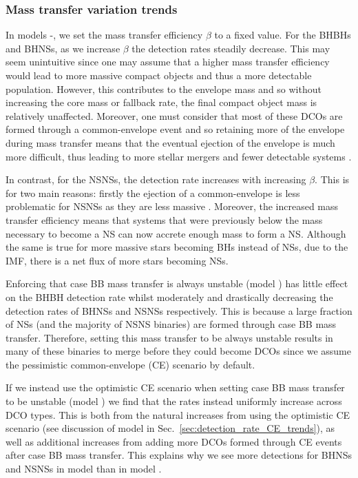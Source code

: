 \subsubsection{Mass transfer variation trends}

In models \modBetaLow{}-\modBetaHigh{}, we set the mass transfer efficiency $\beta$ to a fixed value. For the BHBHs and BHNSs, as we increase $\beta$ the detection rates steadily decrease. This may seem unintuitive since one may assume that a higher mass transfer efficiency would lead to more massive compact objects and thus a more detectable population. However, this contributes to the envelope mass and so without increasing the core mass or fallback rate, the final compact object mass is relatively unaffected. Moreover, one must consider that most of these DCOs are formed through a common-envelope event and so retaining more of the envelope during mass transfer means that the eventual ejection of the envelope is much more difficult, thus leading to more stellar mergers and fewer detectable systems \citep[e.g.][]{Kruckow+2018,Broekgaarden+2021}.

In contrast, for the NSNSs, the detection rate increases with increasing $\beta$. This is for two main reasons: firstly the ejection of a common-envelope is less problematic for NSNSs as they are less massive \citep[e.g.][]{Kruckow+2018}. Moreover, the increased mass transfer efficiency means that systems that were previously below the mass necessary to become a NS can now accrete enough mass to form a NS. Although the same is true for more massive stars becoming BHs instead of NSs, due to the IMF, there is a net flux of more stars becoming NSs.

Enforcing that case BB mass transfer is always unstable (model \modCaseBB{}) has little effect on the BHBH detection rate whilst moderately and drastically decreasing the detection rates of BHNSs and NSNSs respectively. This is because a large fraction of NSs (and the majority of NSNS binaries) are formed through case BB mass transfer. Therefore, setting this mass transfer to be always unstable results in many of these binaries to merge before they could become DCOs since we assume the pessimistic common-envelope (CE) scenario by default.

If we instead use the optimistic CE scenario when setting case BB mass transfer to be unstable (model \modCaseBBOpt{}) we find that the rates instead uniformly increase across DCO types. This is both from the natural increases from using the optimistic CE scenario (see discussion of model \modOpt{} in Sec.~\ref{sec:detection_rate_CE_trends}), as well as additional increases from adding more DCOs formed through CE events after case BB mass transfer. This explains why we see more detections for BHNSs and NSNSs in model \modCaseBBOpt{} than in model \modOpt{}.

